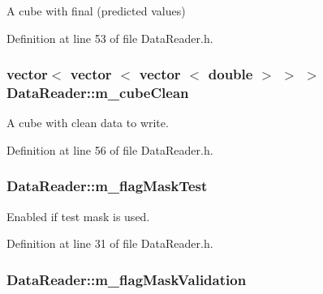 A cube with final (predicted values) 



Definition at line 53 of file Data\+Reader.\+h.

\subsubsection[{\texorpdfstring{m\+\_\+cube\+Clean}{m_cubeClean}}]{\setlength{\rightskip}{0pt plus 5cm}vector$<$ vector $<$ vector $<$ double $>$ $>$ $>$ Data\+Reader\+::m\+\_\+cube\+Clean\hspace{0.3cm}{\ttfamily [private]}}\hypertarget{classDataReader_a3647b5fff6dff6a92c8f2f83dfcfa055}{}\label{classDataReader_a3647b5fff6dff6a92c8f2f83dfcfa055}


A cube with clean data to write. 



Definition at line 56 of file Data\+Reader.\+h.

\subsubsection[{\texorpdfstring{m\+\_\+flag\+Mask\+Test}{m_flagMaskTest}}]{ Data\+Reader\+::m\+\_\+flag\+Mask\+Test\hspace{0.3cm}{\ttfamily [private]}}\hypertarget{classDataReader_a71945ad4af9366b1d4060d49e01e34f9}{}\label{classDataReader_a71945ad4af9366b1d4060d49e01e34f9}


Enabled if test mask is used. 



Definition at line 31 of file Data\+Reader.\+h.

\subsubsection[{\texorpdfstring{m\+\_\+flag\+Mask\+Validation}{m_flagMaskValidation}}]{ Data\+Reader\+::m\+\_\+flag\+Mask\+Validation\hspace{0.3cm}{\ttfamily [private]}}\hypertarget{classDataReader_a047fea2d4cf25627f3df820b560d95be}{}\label{classDataReader_a047fea2d4cf25627f3df820b560d95be}


